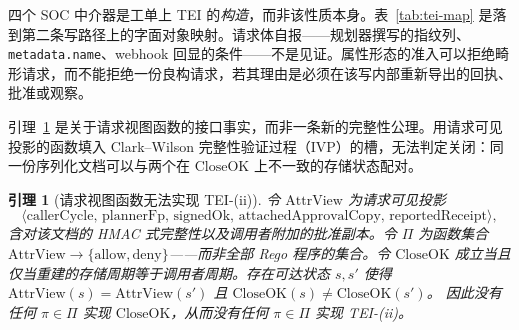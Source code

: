 \documentclass[acmsmall,manuscript,review,anonymous]{acmart}
\renewcommand{\_}{\discretionary{\textunderscore}{}{\textunderscore}}
\newtheorem{lemma}{引理}
\begin{document}
四个 SOC 中介器是工单上 TEI 的\emph{构造}，而非该性质本身。表~\ref{tab:tei-map} 是落到第二条写路径上的字面对象映射。请求体自报——规划器撰写的指纹列、\texttt{metadata.name}、webhook 回显的条件——不是见证。属性形态的准入可以拒绝畸形请求，而不能拒绝一份良构请求，若其理由是必须在该写内部重新导出的回执、批准或观察。

引理~\ref{thm:attr} 是关于请求视图函数的接口事实，而非一条新的完整性公理。用请求可见投影的函数填入 Clark--Wilson 完整性验证过程（{IVP}）的槽，无法判定关闭：同一份序列化文档可以与两个在 $\mathrm{CloseOK}$ 上不一致的存储状态配对。

\begin{lemma}[请求视图函数无法实现 TEI-(ii)]
\label{thm:attr}
令 $\mathrm{AttrView}$ 为请求可见投影
\[
\langle\mathrm{callerCycle},\,\mathrm{plannerFp},\,\mathrm{signedOk},\,
\mathrm{attachedApprovalCopy},\,\mathrm{reportedReceipt}\rangle,
\]
含对该文档的 {HMAC} 式完整性以及调用者附加的批准副本。令 $\Pi$ 为函数集合
$\mathrm{AttrView}\to\{\mathrm{allow},\mathrm{deny}\}$——而非全部 {Rego} 程序的集合。令 $\mathrm{CloseOK}$ 成立当且仅当重建的存储周期等于调用者周期。存在可达状态 $s,s'$ 使得
$\mathrm{AttrView}(s)=\mathrm{AttrView}(s')$ 且
$\mathrm{CloseOK}(s)\neq\mathrm{CloseOK}(s')$。
因此没有任何 $\pi\in\Pi$ 实现 $\mathrm{CloseOK}$，从而没有任何
$\pi\in\Pi$ 实现 TEI-(ii)。
\end{lemma}
\end{document}
